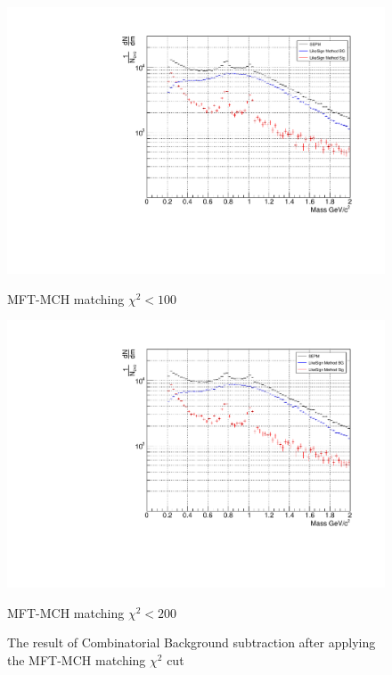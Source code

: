 \begin{figure}[H]
\begin{minipage}{0.45\textwidth}
                \end{minipage}
                \\
                \vspace{1em}
                \begin{minipage}{0.45\textwidth}
                    \centering
                    \includegraphics[width=\textwidth]{fig/3_4_4_CB_chi2_100.pdf}
                    \caption*{MFT-MCH matching $\chi^2 < 100$}
                \end{minipage}
                \hfill
                \begin{minipage}{0.45\textwidth}
                    \centering
                    \includegraphics[width=\textwidth]{fig/3_4_4_CB_chi2_200.pdf}
                    \caption*{MFT-MCH matching $\chi^2 < 200$}
                \end{minipage}
                \caption{The result of Combinatorial Background subtraction after applying the MFT-MCH matching $\chi^2$ cut}
                \label{Analysis:Dimuon:Matching_CB}
            \end{figure}


